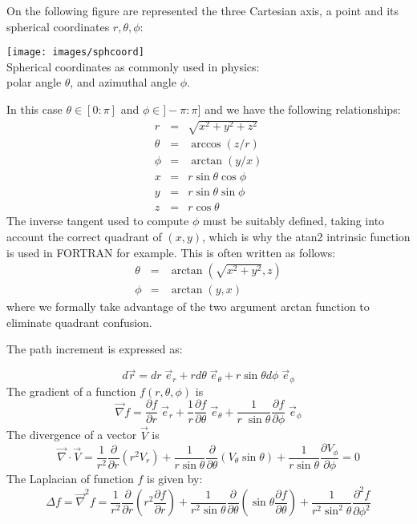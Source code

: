 On the following figure are represented the three Cartesian axis, 
a point and its spherical coordinates $r,\theta,\phi$:
\begin{center}
\texttt{[image: images/sphcoord]}\\
{\captionfont Spherical coordinates as commonly used in physics:\\ polar angle $\theta$, and azimuthal angle $\phi$.} 
\end{center}
In this case $\theta\in[0:\pi]$ and $\phi\in]-\pi:\pi]$ and we have the following relationships:
\begin{eqnarray}
r &=& \sqrt{x^2+y^2+z^2} \\
\theta &=& \arccos (z/r) \\
\phi &=& \arctan (y/x) \\
x &=& r \sin \theta \cos \phi \\
y &=& r \sin\theta \sin\phi \\
z &=& r \cos\theta 
\end{eqnarray}
The inverse tangent used to compute $\phi$ must be suitably defined, 
taking into account the correct quadrant of $(x,y)$,
which is why the atan2 intrinsic function is used in \textsc{FORTRAN} for example.    
This is often written as follows:
\begin{eqnarray}
\theta &=& \arctan \left(\sqrt{x^2+y^2},z\right) \\
\phi &=& \arctan (y,x) 
\end{eqnarray}
where we formally take advantage of the two argument arctan
function to eliminate quadrant confusion.

The path increment is expressed as:

\begin{equation}
d\vec{r} = dr \; \vec{e}_r + r d\theta \; \vec{e}_\theta + r \sin\theta d\phi \; \vec{e}_\phi
\end{equation}
The gradient of a function $f(r,\theta,\phi)$ is 
\begin{equation}
\vec\nabla f= \frac{\partial f}{\partial r} \; \vec{e}_r
+ \frac{1}{r} \frac{\partial f}{\partial \theta} \; \vec{e}_\theta 
+ \frac{1}{r \; \sin\theta} \frac{\partial f}{\partial \phi} \;  \vec{e}_\phi
\end{equation}
The divergence of a vector $\vec{V}$ is
\begin{equation}
\vec\nabla\cdot \vec{V}=
\frac{1}{r^2} \frac{\partial}{\partial r} \left(r^2 V_r \right) 
+
\frac{1}{r \sin\theta} \frac{\partial}{\partial \theta} (V_\theta \sin\theta)
+
\frac{1}{r \sin\theta} \frac{\partial V_\phi}{\partial \phi}=0
\label{eq:divsc}
\end{equation}
The Laplacian of function $f$ is given by: 
\begin{equation}
\Delta f= \vec\nabla^2 f
=
\frac{1}{r^2}\frac{\partial}{\partial r} \left( r^2 \frac{\partial f}{\partial r} \right)
+\frac{1}{r^2 \sin\theta} \frac{\partial}{\partial \theta} \left( \sin\theta \frac{\partial f}{\partial \theta} \right)
+\frac{1}{r^2 \sin^2\theta}  \frac{\partial^2 f}{\partial \phi^2}
\end{equation}

